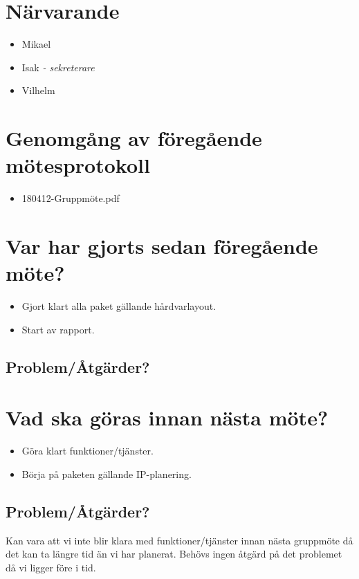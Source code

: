 
\section*{Närvarande}
\begin{itemize}[noitemsep]
    \item Mikael
    \item Isak \textit{- sekreterare}
    \item Vilhelm
\end{itemize}

\section*{Genomgång av föregående mötesprotokoll}
\begin{itemize}[noitemsep]
    \item 180412-Gruppmöte.pdf
\end{itemize}

\section*{Var har gjorts sedan föregående möte?}
\begin{itemize}[noitemsep]
    \item Gjort klart alla paket gällande hårdvarlayout.
    \item Start av rapport.
\end{itemize}

\subsection*{Problem/Åtgärder?}

\section*{Vad ska göras innan nästa möte?}
\begin{itemize}[noitemsep]
	\item Göra klart funktioner/tjänster.
	\item Börja på paketen gällande IP-planering.
\end{itemize}
\subsection*{Problem/Åtgärder?}
Kan vara att vi inte blir klara med funktioner/tjänster innan nästa gruppmöte då det kan ta längre tid än vi har planerat. Behövs ingen åtgärd på det problemet då vi ligger före i tid.
